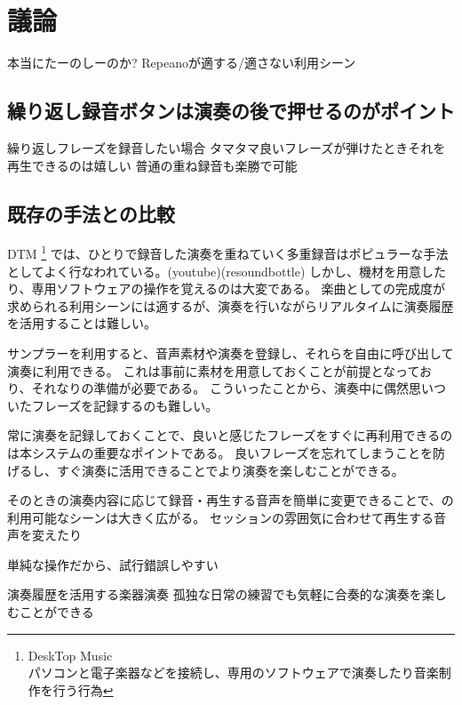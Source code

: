 \section{議論}

本当にたーのしーのか?
Repeanoが適する/適さない利用シーン

\subsection{繰り返し録音ボタンは演奏の後で押せるのがポイント}
繰り返しフレーズを録音したい場合
タマタマ良いフレーズが弾けたときそれを再生できるのは嬉しい
普通の重ね録音も楽勝で可能

\subsection{既存の手法との比較}


DTM
\footnote{\textsf{DeskTop Music\\パソコンと電子楽器などを接続し、専用のソフトウェアで演奏したり音楽制作を行う行為}}
では、ひとりで録音した演奏を重ねていく多重録音はポピュラーな手法としてよく行なわれている。(youtube)(resoundbottle)
しかし、機材を用意したり、専用ソフトウェアの操作を覚えるのは大変である。
楽曲としての完成度が求められる利用シーンには適するが、演奏を行いながらリアルタイムに演奏履歴を活用することは難しい。

サンプラーを利用すると、音声素材や演奏を登録し、それらを自由に呼び出して演奏に利用できる。
これは事前に素材を用意しておくことが前提となっており、それなりの準備が必要である。
こういったことから、演奏中に偶然思いついたフレーズを記録するのも難しい。

常に演奏を記録しておくことで、良いと感じたフレーズをすぐに再利用できるのは本システムの重要なポイントである。
良いフレーズを忘れてしまうことを防げるし、すぐ演奏に活用できることでより演奏を楽しむことができる。

そのときの演奏内容に応じて録音・再生する音声を簡単に変更できることで、{\system}の利用可能なシーンは大きく広がる。
セッションの雰囲気に合わせて再生する音声を変えたり

単純な操作だから、試行錯誤しやすい

演奏履歴を活用する楽器演奏
孤独な日常の練習でも気軽に合奏的な演奏を楽しむことができる

